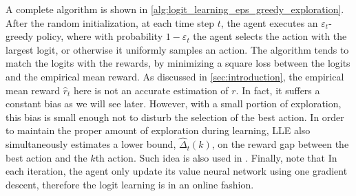 A complete algorithm is shown in \cref{alg:logit_learning_eps_greedy_exploration}. 
After the random initialization, at each time step $t$, the agent executes an $\varepsilon_t$-greedy policy, where with probability $1 - \varepsilon_t$ the agent selects the action with the largest logit, or otherwise it uniformly samples an action.
The algorithm tends to match the logits with the rewards, by minimizing a square loss between the logits and the empirical mean reward.
As discussed in \ref{sec:introduction}, the empirical mean reward $\hat{r}_t$ here is not an accurate estimation of $r$. In fact, it suffers a constant bias as we will see later.
However, with a small portion of exploration, this bias is small enough not to disturb the selection of the best action.
In order to maintain the proper amount of exploration during learning, 
LLE also simultaneously estimates a lower bound, $\hat{\Delta}_t(k)$, on the reward gap between the best action and the $k$th action. 
Such idea is also used in  \cite{seldin2017improved}.
Finally, note that In each iteration, the agent only update its value neural network using one gradient descent, therefore the logit learning is in an online fashion.


